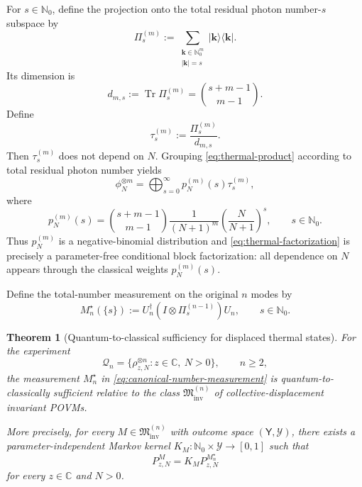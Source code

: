 \documentclass{article}
\newtheorem{theorem}{Theorem}[section]
\theoremstyle{named}
\theoremstyle{named1}
\newcommand{\N}{\mathbb{N}}
\newcommand{\Tr}{\operatorname{Tr}}
\newcommand{\bm}{\mathbf}
\newcommand{\bbC}{\mathbb C}
\newcommand{\cQ}{\mathcal Q}
\newcommand{\cM}{\mathfrak M}
\theoremstyle{plain}
\theoremstyle{remark}
\begin{document}
For $s\in\N_0$, define the projection onto the total residual photon number-$s$
subspace by
\begin{equation}
    \Pi_s^{(m)}
    :=
    \sum_{\substack{\bm k\in\N_0^m\\|\bm k|=s}}
    |\bm k\rangle\langle\bm k|.
    \label{eq:total-number-proj}
\end{equation}
Its dimension is
\begin{equation}
    d_{m,s}
    :=
    \Tr\Pi_s^{(m)}
    =
    \binom{s+m-1}{m-1}.
    \label{eq:block-dimension}
\end{equation}
Define
\begin{equation}
    \tau_s^{(m)}
    :=
    \frac{\Pi_s^{(m)}}{d_{m,s}}.
    \label{eq:conditional-block-state}
\end{equation}
Then
$\tau_s^{(m)}
$
does not depend on $N$. Grouping \eqref{eq:thermal-product} according to total residual photon number yields
\begin{equation}
    \phi_N^{\otimes m}
    =
    \bigoplus_{s=0}^{\infty}
    p_N^{(m)}(s)\tau_s^{(m)},
   \label{eq:thermal-factorization}
\end{equation}
where
\begin{equation}
    p_N^{(m)}(s)
    =
    \binom{s+m-1}{m-1}
    \frac{1}{(N+1)^m}
    \left(
        \frac{N}{N+1}
    \right)^s,
    \qquad
    s\in\N_0.
    \label{eq:negative-binomial}
\end{equation}
Thus $p_N^{(m)}$ is a negative-binomial distribution and \eqref{eq:thermal-factorization} is precisely a
parameter-free conditional block factorization: all dependence on $N$ appears
through the classical weights $p_N^{(m)}(s)$.

Define the total-number measurement on the original $n$ modes by
\begin{equation}
    M_n^\star(\{s\})
    :=
    U_n^\dagger
    \left(
        I\otimes\Pi_s^{(n-1)}
    \right)
    U_n,
    \qquad
    s\in\N_0.
    \label{eq:canonical-number-measurement}
\end{equation}

\begin{theorem}[Quantum-to-classical sufficiency for displaced thermal states]
\label{thm:thermal-q2c}
For the experiment
\[
    \cQ_n
    =
    \{
        \rho_{z,N}^{\otimes n}
        :
        z\in\bbC,\ N>0
    \},
\qquad n\ge2,
\]
the measurement $M_n^\star$ in
\eqref{eq:canonical-number-measurement} is quantum-to-classically sufficient
relative to the class
$\cM_{\mathrm{inv}}^{(n)}$ of collective-displacement invariant POVMs.

More precisely, for every
$ M\in\cM_{\mathrm{inv}}^{(n)}$
with outcome space $(\mathsf Y,\mathcal Y)$, there exists a
parameter-independent Markov kernel
$ K_M:
    \N_0\times\mathcal Y
    \rightarrow[0,1]
$
such that
\begin{equation}
    P_{z,N}^{M}
    =
    K_M P_{z,N}^{M_n^\star}
    \label{eq:q2c-kernel}
\end{equation}
for every $z\in\bbC$ and $N>0$.
\end{theorem}
\end{document}
